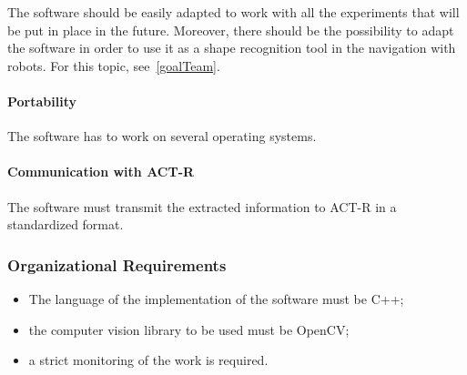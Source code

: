 				The software should be easily adapted to work with all the experiments that will be put in place in the future. Moreover, there should be the possibility to adapt the software in order to use it as a shape recognition tool in the navigation with robots. For this topic, see~\ref{goalTeam}. 				
			
				\paragraph{Portability} 
				The software has to work on several operating systems.
			
				\paragraph{Communication with ACT-R} 			
				The software must transmit the extracted information to \mbox{ACT-R} in a standardized format.

			
			\subsubsection{Organizational Requirements}
			\begin{itemize}
				\item The language of the implementation of the software must be C++;
				\item the computer vision library to be used must be OpenCV;
			    	\item a strict monitoring of the work is required.					
			\end{itemize}
		

